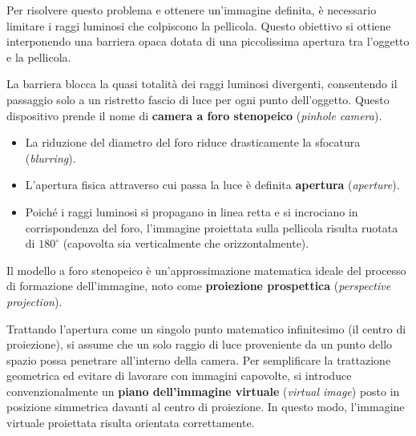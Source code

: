 ﻿\documentclass[11pt, a4paper]{article}
\begin{document}
Per risolvere questo problema e ottenere un'immagine definita, è necessario limitare i raggi luminosi che colpiscono la pellicola. Questo obiettivo si ottiene interponendo una barriera opaca dotata di una piccolissima apertura tra l'oggetto e la pellicola.


La barriera blocca la quasi totalità dei raggi luminosi divergenti, consentendo il passaggio solo a un ristretto fascio di luce per ogni punto dell'oggetto. Questo dispositivo prende il nome di \textbf{camera a foro stenopeico} (\emph{pinhole camera}).
\begin{itemize}[noitemsep]
    \item La riduzione del diametro del foro riduce drasticamente la sfocatura (\emph{blurring}).
    \item L'apertura fisica attraverso cui passa la luce è definita \textbf{apertura} (\emph{aperture}).
    \item Poiché i raggi luminosi si propagano in linea retta e si incrociano in corrispondenza del foro, l'immagine proiettata sulla pellicola risulta ruotata di $180^\circ$ (capovolta sia verticalmente che orizzontalmente).
\end{itemize}

Il modello a foro stenopeico è un'approssimazione matematica ideale del processo di formazione dell'immagine, noto come \textbf{proiezione prospettica} (\emph{perspective projection}).


Trattando l'apertura come un singolo punto matematico infinitesimo (il centro di proiezione), si assume che un solo raggio di luce proveniente da un punto dello spazio possa penetrare all'interno della camera. Per semplificare la trattazione geometrica ed evitare di lavorare con immagini capovolte, si introduce convenzionalmente un \textbf{piano dell'immagine virtuale} (\emph{virtual image}) posto in posizione simmetrica davanti al centro di proiezione. In questo modo, l'immagine virtuale proiettata risulta orientata correttamente.

\newpage
\end{document}

